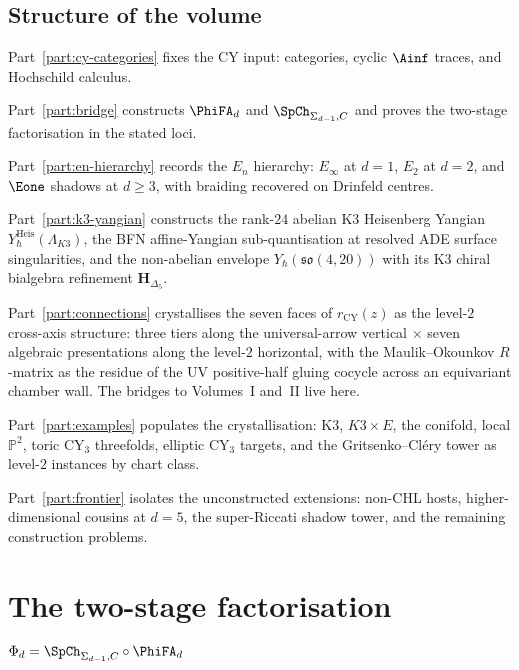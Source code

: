 \subsection{Structure of the volume}
\label{wn:sec:platonic-intro-structure}

Part~\ref{part:cy-categories} fixes the CY input: categories, cyclic
$\Ainf$ traces, and Hochschild calculus.

Part~\ref{part:bridge} constructs $\PhiFA_d$ and
$\SpCh_{\Sigma_{d-1}, C}$ and proves the two-stage factorisation in
the stated loci.

Part~\ref{part:en-hierarchy} records the $E_n$ hierarchy:
$E_\infty$ at $d=1$, $E_2$ at $d=2$, and $\Eone$ shadows at
$d\geq 3$, with braiding recovered on Drinfeld centres.

Part~\ref{part:k3-yangian} constructs the rank-$24$ abelian K3
Heisenberg Yangian $Y_\hbar^{\mathrm{Heis}}(\Lambda_{K3})$, the
BFN affine-Yangian sub-quantisation at resolved ADE surface
singularities, and the non-abelian envelope $Y_\hbar(\mathfrak{so}(4,20))$
with its K3 chiral bialgebra refinement $\mathbf{H}_{\Delta_5}$.

Part~\ref{part:connections} crystallises the seven faces of
$r_{\mathrm{CY}}(z)$ as the level-$2$ cross-axis structure: three
tiers along the universal-arrow vertical $\times$ seven algebraic
presentations along the level-$2$ horizontal, with the
Maulik--Okounkov $R$-matrix as the residue of the UV positive-half
gluing cocycle across an equivariant chamber wall. The bridges to
Volumes~I and~II live here.

Part~\ref{part:examples} populates the crystallisation: K3,
$K3\times E$, the conifold, local $\mathbb{P}^2$, toric CY$_3$
threefolds, elliptic CY$_3$ targets, and the Gritsenko--Cl\'ery
tower as level-$2$ instances by chart class.

Part~\ref{part:frontier} isolates the unconstructed extensions:
non-CHL hosts, higher-dimensional cousins at $d=5$, the
super-Riccati shadow tower, and the remaining construction problems.

\section{The two-stage factorisation \texorpdfstring{$\Phi_d = \SpCh_{\Sigma_{d-1}, C}\circ\PhiFA_d$}{Phi-d = SpCh-Sigma-d-1, CoPhiFA-d}}
\label{sec:two-stage-factorisation}

